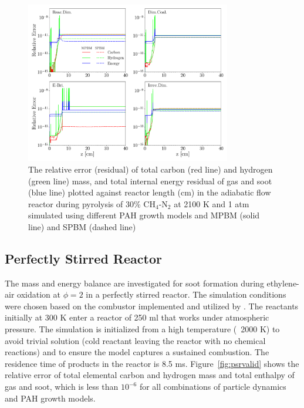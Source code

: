 \begin{figure}[H]
	\centering
	\includegraphics[width=0.8\textwidth]{Figures/Results/Validation/PFR/relerr_pfr.pdf}
	\caption{The relative error (residual) of total carbon (red line) and hydrogen (green line) mass, and total internal energy residual of gas and soot (blue line) plotted against reactor length (cm) in the adiabatic flow reactor during pyrolysis of 30\% $\mathrm{CH_4}$-$\mathrm{N_2}$ at 2100 K and 1 atm simulated using different PAH growth models and MPBM (solid line) and SPBM (dashed line)}
	\label{fig:pfrvalid}
\end{figure}

\subsection{Perfectly Stirred Reactor}
\label{sec:psrvalid}
The mass and energy balance are investigated for soot formation during ethylene-air oxidation at $\phi=2$ in a perfectly stirred reactor. The simulation conditions were chosen based on the combustor implemented and utilized by \citet{stouffer2002combustion}. The reactants initially at 300 K enter a reactor of 250 ml that works under atmospheric pressure. The simulation is initialized from a high temperature (~2000 K) to avoid trivial solution (cold reactant leaving the reactor with no chemical reactions) and to ensure the model captures a sustained combustion. The residence time of products in the reactor is 8.5 ms. Figure~\ref{fig:psrvalid} shows the relative error of total elemental carbon and hydrogen mass and total enthalpy of gas and soot, which is less than $10^{-6}$ for all combinations of particle dynamics and PAH growth models.

